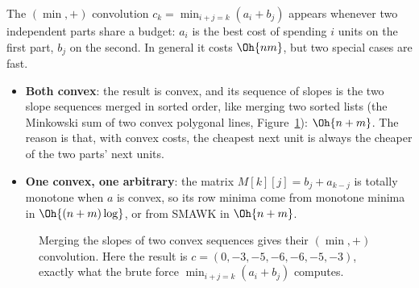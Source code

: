 The $(\min, +)$ convolution $c_k = \min_{i + j = k} (a_i + b_j)$ appears whenever two independent parts share a budget: $a_i$ is the
best cost of spending $i$ units on the first part, $b_j$ on the second. In general it costs $\Oh{nm}$, but two special cases are fast.
\begin{itemize}
  \item \textbf{Both convex}: the result is convex, and its sequence of slopes is the two slope sequences merged in sorted order, like
        merging two sorted lists (the Minkowski sum of two convex polygonal lines, Figure~\ref{fig:minplus}): $\Oh{n + m}$. The
        reason is that, with convex costs, the cheapest next unit is always the cheaper of the two parts' next units.
  \item \textbf{One convex, one arbitrary}: the matrix $M[k][j] = b_j + a_{k - j}$ is totally monotone when $a$ is convex, so its row
        minima come from monotone minima in $\Oh{(n + m) \log}$, or from SMAWK in $\Oh{n + m}$.
\end{itemize}

\begin{figure}[htbp]
\centering
{}
\caption{Merging the slopes of two convex sequences gives their $(\min, +)$ convolution. Here the result is $c = (0, -3, -5, -6, -6,
-5, -3)$, exactly what the brute force $\min_{i + j = k}(a_i + b_j)$ computes.}
\label{fig:minplus}
\end{figure}

